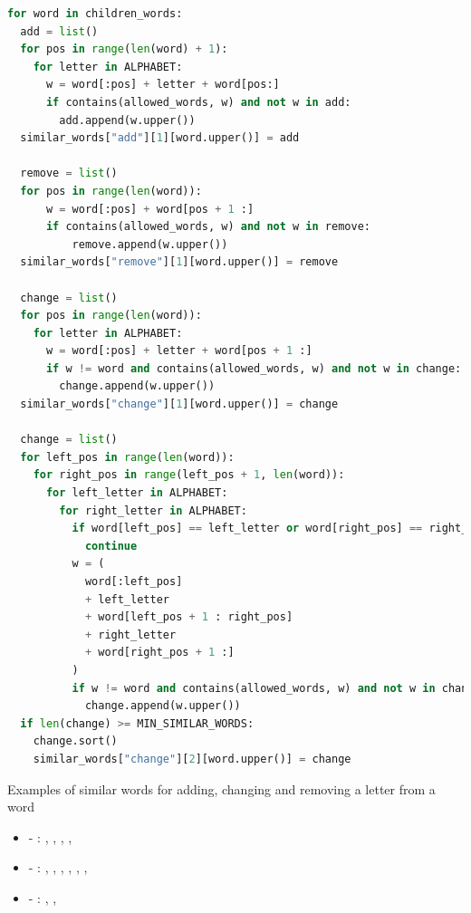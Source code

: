 \begin{lstlisting}[language=Python,caption={Algorithm to generate a list of similar words in Python},label={lst:similarWords}]
for word in children_words:
  add = list()
  for pos in range(len(word) + 1):
    for letter in ALPHABET:
      w = word[:pos] + letter + word[pos:]
      if contains(allowed_words, w) and not w in add:
        add.append(w.upper())
  similar_words["add"][1][word.upper()] = add

  remove = list()
  for pos in range(len(word)):
      w = word[:pos] + word[pos + 1 :]
      if contains(allowed_words, w) and not w in remove:
          remove.append(w.upper())
  similar_words["remove"][1][word.upper()] = remove

  change = list()
  for pos in range(len(word)):
    for letter in ALPHABET:
      w = word[:pos] + letter + word[pos + 1 :]
      if w != word and contains(allowed_words, w) and not w in change:
        change.append(w.upper())
  similar_words["change"][1][word.upper()] = change

  change = list()
  for left_pos in range(len(word)):
    for right_pos in range(left_pos + 1, len(word)):
      for left_letter in ALPHABET:
        for right_letter in ALPHABET:
          if word[left_pos] == left_letter or word[right_pos] == right_letter:
            continue
          w = (
            word[:left_pos]
            + left_letter
            + word[left_pos + 1 : right_pos]
            + right_letter
            + word[right_pos + 1 :]
          )
          if w != word and contains(allowed_words, w) and not w in change:
            change.append(w.upper())
  if len(change) >= MIN_SIMILAR_WORDS:
    change.sort()
    similar_words["change"][2][word.upper()] = change
\end{lstlisting}

\begin{example}
  Examples of similar words for adding, changing and removing a letter from a word
  \begin{itemize}
    \item {} - : , , , , 
    \item {} - : , , , , , , 
    \item {} - : , , 
  \end{itemize}
\end{example}


